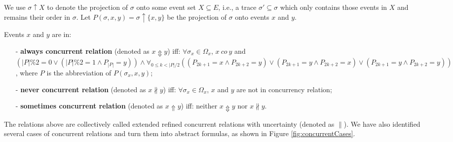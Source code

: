 \documentclass{llncs}
\begin{document}
We use $\sigma\uparrow X$ to denote the projection of $\sigma$ onto some event set $X\subseteq E$, i.e., a trace $\sigma'\subseteq\sigma$ which only contains those events in $X$ and remains their order in $\sigma$. Let $P(\sigma,x,y)=\sigma\uparrow\{x,y\}$ be the projection of $\sigma$ onto events $x$ and $y$.

\begin{definition}\label{def:extendedConcurrent}
Events $x$ and $y$ are in:
	\begin{itemize}
		\item[-] \textbf{always concurrent relation} (denoted as $x\Updownarrow y$) iff: $\forall\sigma_{x}\in\Omega_{x}$, $x~co~y$ and $(|P|\%2=0\vee(|P|\%2=1\wedge P_{|P|}=y))\wedge\forall_{0\leq k<|P|/2}((P_{2k+1}=x\wedge P_{2k+2}=y)\vee(P_{2k+1}=y\wedge P_{2k+2}=x)\vee(P_{2k+1}=y\wedge P_{2k+2}=y))$, where $P$ is the abbreviation of $P(\sigma_{x},x,y)$;
		\item[-] \textbf{never concurrent relation} (denoted as $x\nparallel y$) iff: $\forall\sigma_{x}\in\Omega_{x}$, $x$ and $y$ are not in concurrency relation;
		\item[-] \textbf{sometimes concurrent relation} (denoted as $x\Uparrow y$) iff: neither $x\Updownarrow y$ nor $x\nparallel y$.
	\end{itemize}
\end{definition}

The relations above are collectively called extended refined concurrent relations with uncertainty (denoted as $\parallel$). We have also identified several cases of concurrent relations and turn them into abstract formulas, as shown in Figure \ref{fig:concurrentCases}.
\end{document}
